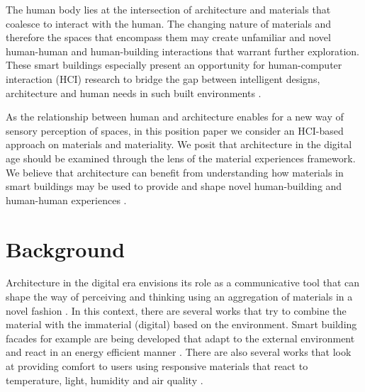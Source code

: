 \documentclass[manuscript, anonymous, review]{acmart}
\begin{document}
The human body lies at the intersection of architecture and materials that coalesce to interact with the human. The changing nature of materials and therefore the spaces that encompass them may create unfamiliar and novel human-human and human-building interactions that warrant further exploration. These smart buildings especially present an opportunity for human-computer interaction (HCI) research to bridge the gap between intelligent designs, architecture and human needs in such built environments \cite{nembrini2017human}.  

As the relationship between human and architecture enables for a new way of sensory perception of spaces, in this position paper we consider an HCI-based approach on materials and materiality. We posit that architecture in the digital age should be examined through the lens of the material experiences framework. We believe that architecture can benefit from understanding how materials in smart buildings may be used to provide and shape novel human-building and human-human experiences  \cite{giaccardi2015foundations, thomas2006material}. 



\section{Background}
Architecture in the digital era envisions its role as a communicative tool that can shape the way of perceiving and thinking using an aggregation of materials in a novel fashion \cite{kolarevic2001designing}. In this context, there are several works that try to combine the material with the immaterial (digital) based on the environment. Smart building facades for example are being developed that adapt to the external environment and react in an energy efficient manner \cite{ahmed2015development}. There are also several works that look at providing comfort to users using responsive materials that react to temperature, light, humidity and air quality \cite{fragkia2020exergy, holstov2015hygromorphic, kroner1997intelligent}. 
\end{document}

